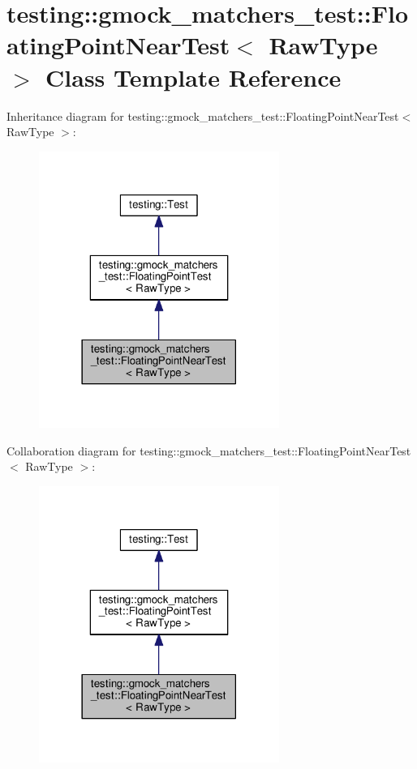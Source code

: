 \hypertarget{classtesting_1_1gmock__matchers__test_1_1FloatingPointNearTest}{}\section{testing\+:\+:gmock\+\_\+matchers\+\_\+test\+:\+:Floating\+Point\+Near\+Test$<$ Raw\+Type $>$ Class Template Reference}
\label{classtesting_1_1gmock__matchers__test_1_1FloatingPointNearTest}


Inheritance diagram for testing\+:\+:gmock\+\_\+matchers\+\_\+test\+:\+:Floating\+Point\+Near\+Test$<$ Raw\+Type $>$\+:\nopagebreak
\begin{figure}[H]
\begin{center}
\leavevmode
\includegraphics[width=222pt]{classtesting_1_1gmock__matchers__test_1_1FloatingPointNearTest__inherit__graph}
\end{center}
\end{figure}


Collaboration diagram for testing\+:\+:gmock\+\_\+matchers\+\_\+test\+:\+:Floating\+Point\+Near\+Test$<$ Raw\+Type $>$\+:\nopagebreak
\begin{figure}[H]
\begin{center}
\leavevmode
\includegraphics[width=222pt]{classtesting_1_1gmock__matchers__test_1_1FloatingPointNearTest__coll__graph}
\end{center}
\end{figure}
